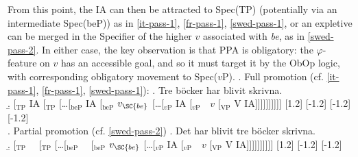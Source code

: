 \documentclass[11pt, letterpaper]{paper_nick}
\begin{document}
From this point, the IA can then be attracted to Spec(TP) (potentially via an intermediate Spec(beP)) as in \ref{it-pass-1}, \ref{fr-pass-1}, \ref{swed-pass-1}, or an expletive can be merged in the Specifier of the higher $v$ associated with \emph{be}, as in \ref{swed-pass-2}. In either case, the key observation is that PPA is obligatory: the $\varphi$-feature on $v$ has an accessible goal, and so it must target it by the ObOp logic, with corresponding obligatory movement to Spec($v$P).  
\ex. Full promotion (cf. \ref{it-pass-1}, \ref{fr-pass-1}, \ref{swed-pass-1}):
\a. Tre b\"ocker har blivit skrivna.\\
\b. [$_\text{TP}$ \hspace*{-.3cm}IA [$_\text{TP}$  [\ldots [$_\text{beP}$ \hspace*{-.3cm}IA [$_\text{beP}$ \hspace*{-.2cm}$v_\SC{be}$ [\ldots [$_\text{$v$P}$ \hspace*{-.3cm}IA [$_\text{$v$P}$\ \ \hspace*{-.2cm}\hspace*{-.2cm}$v$ [$_\text{VP}$ V \hspace*{-.3cm}IA]]]]]]]]]]
[1.2]
[-1.2]
[-1.2]
[-1.2]\\

\ex. Partial promotion (cf. \ref{swed-pass-2})
\a. Det har blivit tre b\"ocker skrivna.\\
\b. [$_\text{TP}$\ \ \hspace*{-.5cm} [$_\text{TP}$  [\ldots [$_\text{beP}$\ \ \hspace*{-.5cm} [$_\text{beP}$ $v_\SC{be}$ [\ldots [$_\text{$v$P}$ \hspace*{-.3cm}IA [$_\text{$v$P}$\ \ \hspace*{-.2cm}\hspace*{-.2cm}$v$ [$_\text{VP}$ V \hspace*{-.3cm}IA]]]]]]]]]]
[1.2]
[-1.2]
[-1.2]\\
\end{document}
